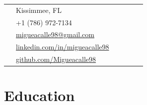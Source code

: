 \documentclass[10pt]{article} %
\begin{document}
\begin{paracol}{2}
\parbox[top][0.12\textheight][c]{\linewidth}{ %
	\vspace{-0.04\textheight} %
	\colorbox{shade}{ %
		\begin{supertabular}{p{0.05\linewidth}|p{0.775\linewidth}} %
			\raisebox{-1pt}{\faHome} & Kissimmee, FL \\ %
			\raisebox{-1pt}{\faPhone} & +1 (786) 972-7134\\ %
			\raisebox{0pt}{\small\faEnvelope} & \href{mailto:migueacalle98@gmail.com}{migueacalle98@gmail.com} \\ %
			\raisebox{-1pt}{\faLinkedin} & \href{https://www.linkedin.com/in/migueacalle98/}{linkedin.com/in/migueacalle98} \\ %
			\raisebox{-1pt}{\faGithub} & \href{https://github.com/Migueacalle98}{github.com/Migueacalle98} \\ %
		\end{supertabular}
	}
}


\section{Education} 





\begin{supertabular}{rl} %

	

\end{supertabular}
\end{paracol}
\end{document}

